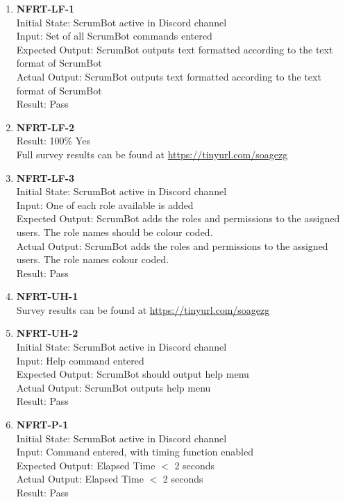 \documentclass[12pt, titlepage]{article}
\begin{document}
\begin{enumerate}
    \item{\textbf{NFRT-LF-1}}\\
    Initial State: ScrumBot active in Discord channel\\
    Input: Set of all ScrumBot commands entered\\
    Expected Output: ScrumBot outputs text formatted according to the text format of ScrumBot\\
    Actual Output: ScrumBot outputs text formatted according to the text format of ScrumBot\\
    Result: Pass

    \item{\textbf{NFRT-LF-2}}\\
    Result: 100\% Yes\\
    Full survey results can be found at \url{https://tinyurl.com/soagezg}

    \item{\textbf{NFRT-LF-3}}\\
    Initial State: ScrumBot active in Discord channel\\
    Input: One of each role available is added\\
    Expected Output: ScrumBot adds the roles and permissions to the assigned users. The role names should be colour coded.\\
    Actual Output: ScrumBot adds the roles and permissions to the assigned users. The role names colour coded.\\
    Result: Pass
    
    \item{\textbf{NFRT-UH-1}}\\
    Survey results can be found at \url{https://tinyurl.com/soagezg}

    \item{\textbf{NFRT-UH-2}}\\
    Initial State: ScrumBot active in Discord channel\\
    Input: Help command entered\\
    Expected Output: ScrumBot should output help menu\\
    Actual Output: ScrumBot outputs help menu\\
    Result: Pass
    
    \item{\textbf{NFRT-P-1}}\\
    Initial State: ScrumBot active in Discord channel\\
    Input: Command entered, with timing function enabled\\
    Expected Output: Elapsed Time $<$ 2 seconds\\
    Actual Output: Elapsed Time $<$ 2 seconds\\
    Result: Pass


\end{enumerate}
\end{document}
